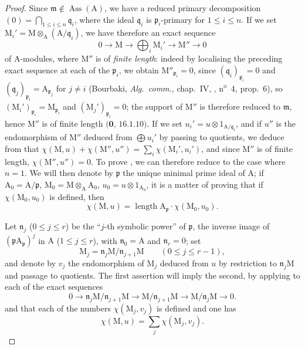 \begin{proof}
Since $\mathfrak{m}\notin\operatorname{Ass}(\mathrm{A})$, we have a reduced primary decomposition $(0)=\bigcap_{1\leq i\leq n}\mathfrak{q}_i$, where the ideal $\mathfrak{q}_i$ is $\mathfrak{p}_i$-primary for $1\leq i\leq n$.
If we set $\mathrm{M}_i'=\mathrm{M}\otimes_{\mathrm{A}}(\mathrm{A}/\mathfrak{q}_i)$, we have therefore an exact sequence
\[
  0\to\mathrm{M}\to\bigoplus_i\mathrm{M}_i'\to\mathrm{M}''\to 0
\]
of A-modules, where $\mathrm{M}''$ is of \emph{finite length}: indeed by localising the preceding exact sequence at each of the $\mathfrak{p}_i$, we obtain $\mathrm{M}''_{\mathfrak{p}_i}=0$, since $(\mathfrak{q}_i)_{\mathfrak{p}_i}=0$ and $(\mathfrak{q}_j)_{\mathfrak{p}_i}=\mathrm{A}_{\mathfrak{p}_j}$ for $j\neq i$ (Bourbaki, \emph{Alg.\ comm.}, chap.~IV, , n$^{\mathrm{o}}$~4, prop.~6), so $(\mathrm{M}_i')_{\mathfrak{p}_i}=\mathrm{M}_{\mathfrak{p}_i}$ and $(\mathrm{M}_j')_{\mathfrak{p}_i}=0$; the support of $\mathrm{M}''$ is therefore reduced to $\mathfrak{m}$, hence $\mathrm{M}''$ is of finite length $(\mathbf{0}$, $16.1.10)$.
If we set $u_i'=u\otimes 1_{\mathrm{A}/\mathfrak{q}_i}$, and if $u''$ is the endomorphism of $\mathrm{M}''$ deduced from $\bigoplus u_i'$ by passing to quotients, we deduce from  that $\chi(\mathrm{M},u)+\chi(\mathrm{M}'',u'')=\sum_i\chi(\mathrm{M}_i',u_i')$, and since $\mathrm{M}''$ is of finite length, $\chi(\mathrm{M}'',u'')=0$.
To prove , we can therefore reduce to the case where $n=1$.
We will then denote by $\mathfrak{p}$ the unique minimal prime ideal of $\mathrm{A}$; if $\mathrm{A}_0=\mathrm{A}/\mathfrak{p}$, $\mathrm{M}_0=\mathrm{M}\otimes_{\mathrm{A}}\mathrm{A}_0$, $u_0=u\otimes 1_{\mathrm{A}_0}$, it is a matter of proving that if $\chi(\mathrm{M}_0,u_0)$ is defined, then
\[
\label{IV.21.10.17.9}
  \chi(\mathrm{M},u)=\operatorname{length}\mathrm{A}_{\mathfrak{p}}\cdot\chi(\mathrm{M}_0,u_0).
  \tag{21.10.17.9}
\]

Let $\mathfrak{n}_j$ ($0\leq j\leq r$) be the ``$j$-th symbolic power'' of $\mathfrak{p}$, the inverse image of $(\mathfrak{p}\mathrm{A}_{\mathfrak{p}})^j$ in $\mathrm{A}$ ($1\leq j\leq r$), with $\mathfrak{n}_0=\mathrm{A}$ and $\mathfrak{n}_r=0$; set
\[
  \mathrm{M}_j=\mathfrak{n}_j\mathrm{M}/\mathfrak{n}_{j+1}\mathrm{M}\qquad(0\leq j\leq r-1),
\]
and denote by $v_j$ the endomorphism of $\mathrm{M}_j$ deduced from $u$ by restriction to $\mathfrak{n}_j\mathrm{M}$ and passage to quotients.
The first assertion will imply the second, by applying  to each of the exact sequences
\[
  0\to\mathfrak{n}_j\mathrm{M}/\mathfrak{n}_{j+1}\mathrm{M}\to\mathrm{M}/\mathfrak{n}_{j+1}\mathrm{M}\to\mathrm{M}/\mathfrak{n}_j\mathrm{M}\to 0.
\]
and that each of the numbers $\chi(\mathrm{M}_j,v_j)$ is defined and one has
\[
\label{IV.21.10.17.10}
  \chi(\mathrm{M},u)=\sum_j\chi(\mathrm{M}_j,v_j).
  \tag{21.10.17.10}
\]


\end{proof}
